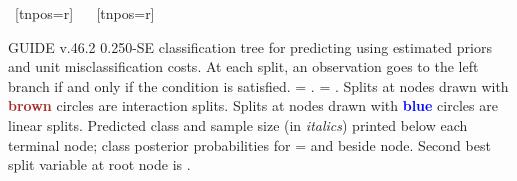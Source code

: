 \documentclass{article}
\begin{document}
\begin{landscape}
\begin{center}
{{{{{    ~[tnpos=r]{}
    ~{}
   }
   }
    ~[tnpos=r]{}
    ~{}
   }
 }
 }
 \end{center}
GUIDE v.46.2 0.250-SE
classification tree for predicting \texttt{} using
estimated priors
and unit misclassification costs.
At each split, an observation goes to the left branch 
 if and only if the condition is satisfied.
\texttt{} = \texttt{}.
\texttt{} = \texttt{}.
 Splits at nodes drawn with \textbf{\textcolor{brown}{brown}} circles are interaction splits.
 Splits at nodes drawn with \textbf{\textcolor{blue}{blue}} circles are linear splits.
Predicted class and sample size (in \emph{italics}) printed below each terminal node;
class posterior probabilities for \texttt{} =
 \texttt{} and \texttt{} beside node.
 Second best split variable at root node is \texttt{}.
 \end{landscape}
 
\end{document}
